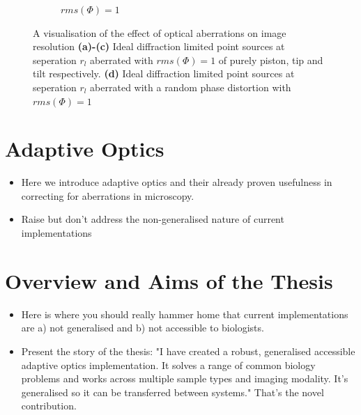 \begin{figure}
\begin{subfigure}{0.49\textwidth}
		\caption{$rms(\Phi) = 1$}
		\label{fig:Airy_ring_2D_2_object_seperation_aberration_comparison_rms_1}
	\end{subfigure}
	\caption[A visualisation of the effect of optical aberrations on image 
	resolution]{A visualisation of the effect of optical aberrations on 
	image resolution \textbf{(a)-(c)} Ideal diffraction limited point 
	sources at seperation $r_{l}$ aberrated with $rms(\Phi) = 1$ of purely 
	piston, tip and tilt respectively. \textbf{(d)} Ideal diffraction 
	limited point sources at seperation $r_{l}$ aberrated with a random 
	phase distortion with $rms(\Phi) = 1$}
	\label{fig:aberrations_res}
\end{figure}

\section{Adaptive Optics}
\label{sec:AO}

\begin{itemize}
	\item Here we introduce adaptive optics and their already proven usefulness in correcting for aberrations in microscopy.
	\item Raise but don't address the non-generalised nature of current implementations
\end{itemize}

\section{Overview and Aims of the Thesis}
\label{sec:overview}

\begin{itemize}
	\item Here is where you should really hammer home that current implementations are a) not generalised and b) not accessible to biologists.
	\item Present the story of the thesis: "I have created a robust, generalised accessible adaptive optics implementation. It solves a range of common biology problems and works across multiple sample types and imaging modality. It's generalised so it can be transferred between systems." That's the novel contribution.
\end{itemize}